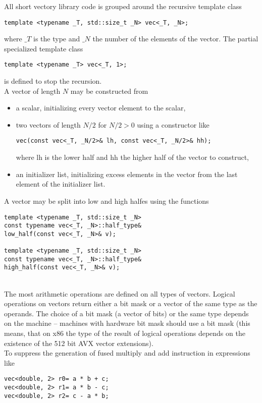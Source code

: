 \documentclass[10pt,a4paper,final,oneside]{article}
\numberwithin{equation}{subsection}
\begin{document}
All short vectory library code is grouped around the recursive template
class
\begin{lstlisting}
template <typename _T, std::size_t _N> vec<_T, _N>;
\end{lstlisting}
where $\_T$ is the type and $\_N$ the number of the elements of the
vector. The partial specialized template class
\begin{lstlisting}
template <typename _T> vec<_T, 1>;
\end{lstlisting}
is defined to stop the recursion.\\
%
A vector of length $N$ may be constructed from
\begin{itemize}
\item a scalar, initializing every vector element to the scalar,
\item two vectors of length $N/2$ for $N/2>0$
      using a constructor like
\begin{lstlisting}
vec(const vec<_T, _N/2>& lh, const vec<_T, _N/2>& hh);
\end{lstlisting}
      where lh is the lower half and hh the higher half of the vector to
      construct,
\item an initializer list, initializing excess elements in the
  vector from the last element of the initializer list.
\end{itemize}
A vector may be split into low and high halfes using the functions
\begin{lstlisting}
template <typename _T, std::size_t _N>
const typename vec<_T, _N>::half_type&
low_half(const vec<_T, _N>& v);

template <typename _T, std::size_t _N>
const typename vec<_T, _N>::half_type&
high_half(const vec<_T, _N>& v);
\end{lstlisting}{\ }\\[10pt]
The most arithmetic operations are defined on all types of vectors.
Logical operations on vectors return either a bit mask or a vector of
the same type as the operands. The choice of a bit mask (a vector of
bits) or the same type depends on the machine -- machines with
hardware bit mask should use a bit mask (this means, that on x86 the
type of the result of logical operations depends on the existence of
the 512 bit AVX vector extensions). \\[10pt]
%
To suppress the generation of fused multiply and add instruction
in expressions like
\begin{lstlisting}
vec<double, 2> r0= a * b + c;
vec<double, 2> r1= a * b - c;
vec<double, 2> r2= c - a * b;
\end{lstlisting}
\end{document}
